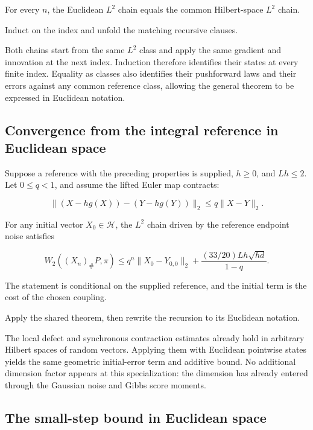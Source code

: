 \documentclass[11pt,a4paper]{report}
\begin{document}
For every \(n\), the Euclidean \(L^2\) chain equals the common Hilbert-space \(L^2\) chain.



Induct on the index and unfold the matching recursive clauses.



Both chains start from the same \(L^2\) class and apply the same gradient and innovation at the next index. Induction therefore identifies their states at every finite index. Equality as classes also identifies their pushforward laws and their errors against any common reference class, allowing the general theorem to be expressed in Euclidean notation.

\subsection{\texorpdfstring{Convergence from the integral reference in Euclidean space}{Convergence from the integral reference in Euclidean space}}
\label{report-step-UnadjustedLangevin-L2Convergence-lean-3}


Suppose a reference with the preceding properties is supplied, \(h\ge0\), and \(Lh\le2\). Let \(0\le q<1\), and assume the lifted Euler map contracts:

\[\|(X-hg(X))-(Y-hg(Y))\|_2\le q\|X-Y\|_2.\]

For any initial vector \(X_0\in\mathcal H\), the \(L^2\) chain driven by the reference endpoint noise satisfies

\[W_2((X_n)_\#P,\pi)\le q^n\|X_0-Y_{0,0}\|_2+\frac{(33/20)Lh\sqrt{hd}}{1-q}.\]

The statement is conditional on the supplied reference, and the initial term is the cost of the chosen coupling.



Apply the shared theorem, then rewrite the recursion to its Euclidean notation.



The local defect and synchronous contraction estimates already hold in arbitrary Hilbert spaces of random vectors. Applying them with Euclidean pointwise states yields the same geometric initial-error term and additive bound. No additional dimension factor appears at this specialization: the dimension has already entered through the Gaussian noise and Gibbs score moments.

\subsection{\texorpdfstring{The small-step bound in Euclidean space}{The small-step bound in Euclidean space}}
\label{report-step-UnadjustedLangevin-L2Convergence-lean-4}
\end{document}
